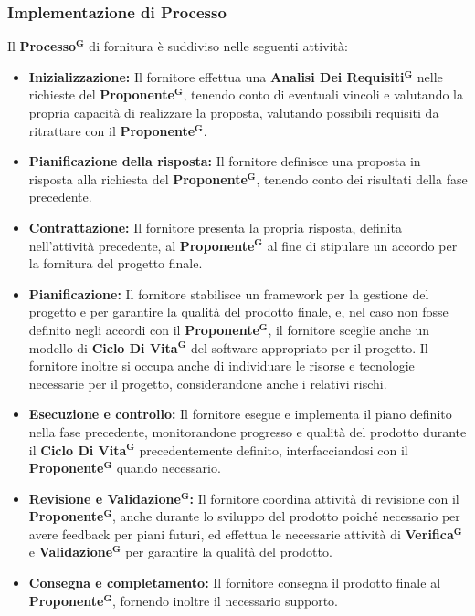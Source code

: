 \documentclass[a4paper,12pt]{article}
\newcommand{\term}[1]{\textbf{#1}$^\mathbf{G}$}
\begin{document}
\subsubsection{Implementazione di Processo}
Il \term{Processo} di fornitura è suddiviso nelle seguenti attività:
\begin{itemize}
    \item \textbf{Inizializzazione:}
    Il fornitore effettua una \term{Analisi Dei Requisiti} nelle richieste del \term{Proponente}, tenendo conto di eventuali vincoli e valutando la propria capacità di realizzare la proposta, valutando possibili requisiti da ritrattare con il \term{Proponente}.

    \item \textbf{Pianificazione della risposta:}
    Il fornitore definisce una proposta in risposta alla richiesta del \term{Proponente}, tenendo conto dei risultati della fase precedente.
    
    \item \textbf{Contrattazione:}
    Il fornitore presenta la propria risposta, definita nell’attività precedente, al \term{Proponente} al fine di stipulare un accordo per la fornitura del progetto finale.

    \item \textbf{Pianificazione:}
    Il fornitore stabilisce un framework per la gestione del progetto e per garantire la qualità del prodotto finale, e, nel caso non fosse definito negli accordi con il \term{Proponente}, il fornitore sceglie anche un modello di \term{Ciclo Di Vita} del software appropriato per il progetto. Il fornitore inoltre si occupa anche di individuare le risorse e tecnologie necessarie per il progetto, considerandone anche i relativi rischi.

    \item \textbf{Esecuzione e controllo:}
    Il fornitore esegue e implementa il piano definito nella fase precedente, monitorandone progresso e qualità del prodotto durante il \term{Ciclo Di Vita} precedentemente definito, interfacciandosi con il \term{Proponente} quando necessario.

    \item \textbf{Revisione e \term{Validazione}:}
    Il fornitore coordina attività di revisione con il \term{Proponente}, anche durante lo sviluppo del prodotto poiché necessario per avere feedback per piani futuri, ed effettua le necessarie attività di \term{Verifica} e \term{Validazione} per garantire la qualità del prodotto.

    \item \textbf{Consegna e completamento:}
    Il fornitore consegna il prodotto finale al \term{Proponente}, fornendo inoltre il necessario supporto.

\end{itemize}
\end{document}
